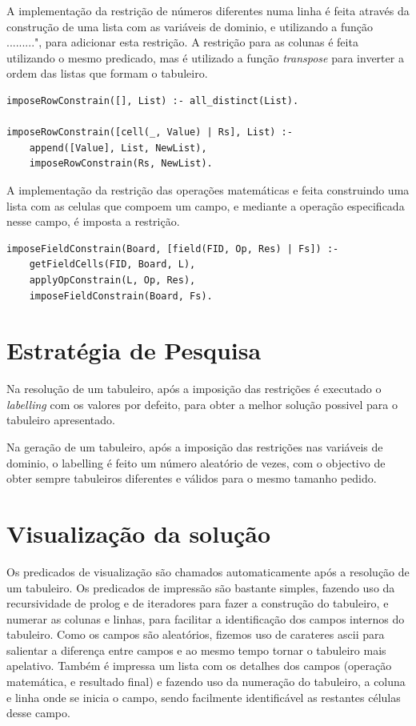 \documentclass[runningheads,a4paper]{llncs}
\begin{document}
A implementação da restrição de números diferentes numa linha é feita através da construção de uma lista com as variáveis de dominio, e utilizando a função .........", para adicionar esta restrição.
A restrição para as colunas é feita utilizando o mesmo predicado, mas é utilizado a função \emph{transpose} para inverter a ordem das listas que formam o tabuleiro.
\begin{verbatim}
imposeRowConstrain([], List) :- all_distinct(List).

imposeRowConstrain([cell(_, Value) | Rs], List) :- 
	append([Value], List, NewList),
	imposeRowConstrain(Rs, NewList).
\end{verbatim}

A implementação da restrição das operações matemáticas e feita construindo uma lista com as celulas que compoem um campo, e mediante a operação especificada nesse campo, é imposta a restrição.
\begin{verbatim}
imposeFieldConstrain(Board, [field(FID, Op, Res) | Fs]) :- 
	getFieldCells(FID, Board, L),
	applyOpConstrain(L, Op, Res),
	imposeFieldConstrain(Board, Fs).
\end{verbatim}

\newpage
\section{Estratégia de Pesquisa}
Na resolução de um tabuleiro, após a imposição das restrições é executado o \emph{labelling} com os valores por defeito, para obter a melhor solução possivel para o tabuleiro apresentado.

Na geração de um tabuleiro, após a imposição das restrições nas variáveis de dominio, o labelling é feito um número aleatório de vezes, com o objectivo de obter sempre tabuleiros diferentes e válidos para o mesmo tamanho pedido.

\section{Visualização da solução}
Os predicados de visualização são chamados automaticamente após a resolução de um tabuleiro.
Os predicados de impressão são bastante simples, fazendo uso da recursividade de prolog e de iteradores para fazer a construção do tabuleiro, e numerar as colunas e linhas, para facilitar a identificação dos campos internos do tabuleiro.
Como os campos são aleatórios, fizemos uso de carateres ascii para salientar a diferença entre campos e ao mesmo tempo tornar o tabuleiro mais apelativo. Também é impressa um lista com os detalhes dos campos (operação matemática, e resultado final) e fazendo uso da numeração do tabuleiro, a coluna e linha onde se inicia o campo, sendo facilmente identificável as restantes células desse campo.
\end{document}
